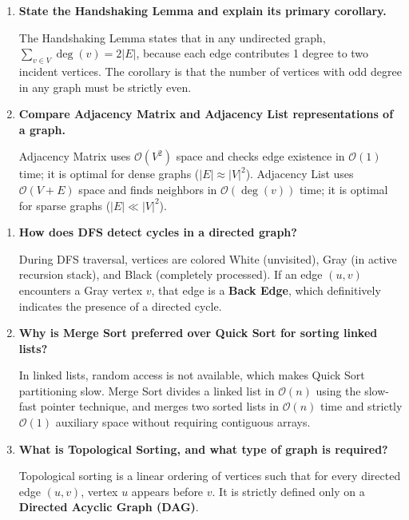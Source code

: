 \documentclass[12pt,a4paper]{article}
\newcommand{\Q}[1]{\textbf{#1}\par\noindent\ignorespaces}
\begin{document}
\begin{tcolorbox}[exambox, title={\textbf{Frequently Asked / Viva Questions (Part 1)}}]
\begin{enumerate}[topsep=0pt, label=\textbf{Q\arabic*.}, itemsep=4pt]
  \item \Q{State the Handshaking Lemma and explain its primary corollary.}
  The Handshaking Lemma states that in any undirected graph, $\sum_{v \in V} \deg(v) = 2|E|$, because each edge contributes 1 degree to two incident vertices. The corollary is that the number of vertices with odd degree in any graph must be strictly even.

  \item \Q{Compare Adjacency Matrix and Adjacency List representations of a graph.}
  Adjacency Matrix uses $\mathcal{O}(V^2)$ space and checks edge existence in $\mathcal{O}(1)$ time; it is optimal for dense graphs ($|E| \approx |V|^2$). Adjacency List uses $\mathcal{O}(V + E)$ space and finds neighbors in $\mathcal{O}(\deg(v))$ time; it is optimal for sparse graphs ($|E| \ll |V|^2$).
\end{enumerate}
\end{tcolorbox}

\newpage

\begin{tcolorbox}[exambox, title={\textbf{Frequently Asked / Viva Questions (Part 2)}}]
\begin{enumerate}[topsep=0pt, label=\textbf{Q\arabic*.}, itemsep=4pt, start=8]
  \item \Q{How does DFS detect cycles in a directed graph?}
  During DFS traversal, vertices are colored White (unvisited), Gray (in active recursion stack), and Black (completely processed). If an edge $(u, v)$ encounters a Gray vertex $v$, that edge is a \textbf{Back Edge}, which definitively indicates the presence of a directed cycle.

  \item \Q{Why is Merge Sort preferred over Quick Sort for sorting linked lists?}
  In linked lists, random access is not available, which makes Quick Sort partitioning slow. Merge Sort divides a linked list in $\mathcal{O}(n)$ using the slow-fast pointer technique, and merges two sorted lists in $\mathcal{O}(n)$ time and strictly $\mathcal{O}(1)$ auxiliary space without requiring contiguous arrays.

  \item \Q{What is Topological Sorting, and what type of graph is required?}
  Topological sorting is a linear ordering of vertices such that for every directed edge $(u, v)$, vertex $u$ appears before $v$. It is strictly defined only on a \textbf{Directed Acyclic Graph (DAG)}.
\end{enumerate}
\end{tcolorbox}
\end{document}
